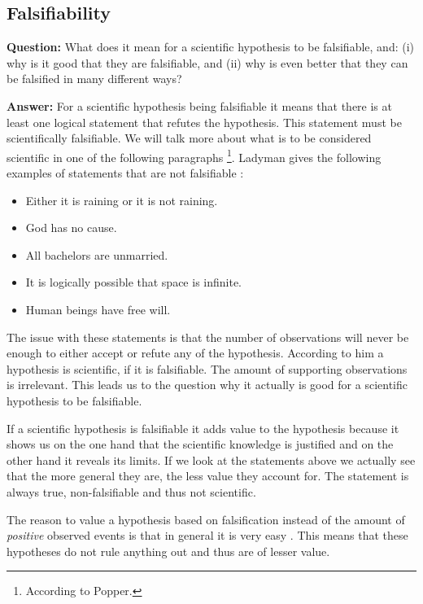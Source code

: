 \documentclass[11pt]{scrartcl}
\begin{document}
\subsection{Falsifiability}

\textbf{Question:} What does it mean for a scientific hypothesis to be falsifiable, and: (i) why is it good that they are falsifiable, and (ii) why is even better that they can be falsified in many different ways?

\bigbreak

\textbf{Answer:} For a scientific hypothesis being falsifiable it means that there is at least one logical statement that refutes the hypothesis. This statement must be scientifically falsifiable. We will talk more about what is to be considered scientific in one of the following paragraphs \footnote{According to Popper.}. Ladyman gives the following examples of statements that are not falsifiable \cite[p. 69]{ladyman}:

\begin{itemize}
  \item Either it is raining or it is not raining.
  \item God has no cause.
  \item All bachelors are unmarried.
  \item It is logically possible that space is infinite.
  \item Human beings have free will.
\end{itemize}

The issue with these statements is that the number of observations will never be enough to either accept or refute any of the hypothesis. According to him a hypothesis is scientific, if it is falsifiable. The amount of supporting observations is irrelevant. This leads us to the question why it actually is good for a scientific hypothesis to be falsifiable.

If a scientific hypothesis is falsifiable it adds value to the hypothesis because it shows us on the one hand that the scientific knowledge is justified and on the other hand it reveals its limits. If we look at the statements above we actually see that the more general they are, the less value they account for. The statement  is always true, non-falsifiable and thus not scientific.

The reason to value a hypothesis based on falsification instead of the amount of \textit{positive} observed events is that in general it is very easy  \cite[p. 66]{ladyman}. This means that these hypotheses do not rule anything out and thus are of lesser value.
\end{document}
